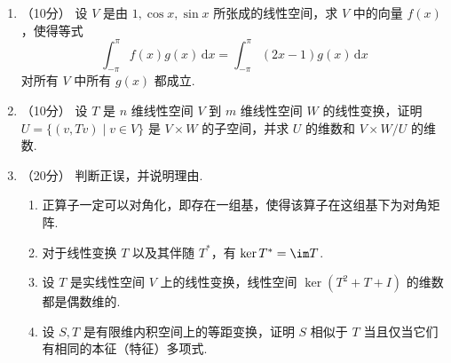 \begin{enumerate}
    \item （10分）
    设 $V$ 是由 $1, \cos x, \sin x$ 所张成的线性空间，求 $V$ 中的向量 $f(x)$，使得等式
    \[
    \int_{-\pi}^{\pi} f(x)g(x) \, \mathrm{d}x = \int_{-\pi}^{\pi} (2x-1)g(x) \, \mathrm{d}x
    \]
    对所有 $V$ 中所有 $g(x)$ 都成立.

    \item （10分）
    设 $T$ 是 $n$ 维线性空间 $V$ 到 $m$ 维线性空间 $W$ 的线性变换，证明 $U = \{(v,Tv) \mid v \in V\}$ 是 $V \times W$ 的子空间，并求 $U$ 的维数和 $V \times W/U$ 的维数.

    \item （20分）
    判断正误，并说明理由.
    \begin{enumerate}
        \item 正算子一定可以对角化，即存在一组基，使得该算子在这组基下为对角矩阵.
        \item 对于线性变换 $T$ 以及其伴随 $T^*$，有 $\ker T^* = \im T$.
        \item 设 $T$ 是实线性空间 $V$ 上的线性变换，线性空间 $\ker(T^2 + T + I)$ 的维数都是偶数维的.
        \item 设 $S,T$ 是有限维内积空间上的等距变换，证明 $S$ 相似于 $T$ 当且仅当它们有相同的本征（特征）多项式.
    \end{enumerate}
\end{enumerate}

\clearpage
